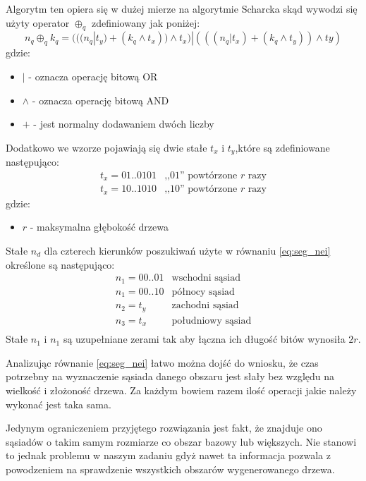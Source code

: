 \documentclass{classrep}
\begin{document}
Algorytm ten opiera się w dużej mierze na algorytmie Scharcka skąd wywodzi się użyty operator $\oplus_{q}$ zdefiniowany jak poniżej:
\begin{equation}
n_{q}\oplus_{q}k_{q} = (((n_{q}|t_{y})+(k_{q}\wedge t_{x}))\wedge t_{x})|(((n_{q}|t_{x})+(k_{q}\wedge t_{y}))\wedge t{y})
\end{equation}
gdzie:
\begin{itemize}
\item $|$ - oznacza operację bitową OR
\item $\wedge$ - oznacza operację bitową AND
\item $+$ - jest normalny dodawaniem dwóch liczby
\end{itemize}

Dodatkowo we wzorze pojawiają się dwie stałe $t_{x}$ i $t_{y}$,które są zdefiniowane następująco:
\begin{equation*}
\begin{array}{cc}
t_{x} = 01..0101& \mbox{,,01'' powtórzone $r$ razy}\\
t_{x} = 10..1010& \mbox{,,10'' powtórzone $r$ razy}
\end{array}
\end{equation*}
gdzie:
\begin{itemize}
\item $r$ - maksymalna głębokość drzewa
\end{itemize}

Stałe $n_{d}$ dla czterech kierunków poszukiwań użyte w równaniu \ref{eq:seg_nei} określone są następująco:
\begin{equation*}
\begin{array}{lc}
n_{1} = 00..01& \mbox{wschodni sąsiad}\\
n_{1} = 00..10& \mbox{północy sąsiad}\\
n_{2} = t_{y}& \mbox{zachodni sąsiad}\\
n_{3} = t_{x}& \mbox{południowy sąsiad}\\
\end{array}
\end{equation*}
Stałe $n_{1}$ i $n_{1}$ są uzupełniane zerami tak aby łączna ich długość bitów wynosiła $2r$.

Analizując równanie \ref{eq:seg_nei} łatwo można dojść do wniosku, że czas potrzebny na wyznaczenie sąsiada danego obszaru jest słały bez względu na wielkość i złożoność drzewa. Za każdym bowiem razem ilość operacji jakie należy wykonać jest taka sama. 

Jedynym ograniczeniem przyjętego rozwiązania jest fakt, że znajduje ono sąsiadów o takim samym rozmiarze co obszar bazowy lub większych. Nie stanowi to jednak problemu w naszym zadaniu gdyż nawet ta informacja pozwala z powodzeniem na sprawdzenie wszystkich obszarów wygenerowanego drzewa.
\end{document}
